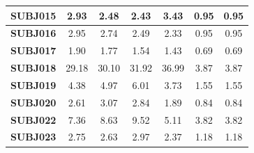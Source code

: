 \documentclass[idxtotoc,hyperref,openany]{labbook} %
\begin{document}
\begin{table}[]
\begin{tabular}{ccccccc}
		\multicolumn{1}{|c|}{\textbf{SUBJ015}}  & \multicolumn{1}{c|}{2.93}              & \multicolumn{1}{c|}{2.48}              & \multicolumn{1}{c|}{2.43}              & \multicolumn{1}{c|}{3.43}         & \multicolumn{1}{c|}{0.95}               & \multicolumn{1}{c|}{0.95}               \\ \hline
		\multicolumn{1}{|c|}{\textbf{SUBJ016}}  & \multicolumn{1}{c|}{2.95}              & \multicolumn{1}{c|}{2.74}              & \multicolumn{1}{c|}{2.49}              & \multicolumn{1}{c|}{2.33}         & \multicolumn{1}{c|}{0.95}               & \multicolumn{1}{c|}{0.95}               \\ \hline
		\multicolumn{1}{|c|}{\textbf{SUBJ017}}  & \multicolumn{1}{c|}{1.90}              & \multicolumn{1}{c|}{1.77}              & \multicolumn{1}{c|}{1.54}              & \multicolumn{1}{c|}{1.43}         & \multicolumn{1}{c|}{0.69}               & \multicolumn{1}{c|}{0.69}               \\ \hline
		\multicolumn{1}{|c|}{\textbf{SUBJ018}}  & \multicolumn{1}{c|}{29.18}             & \multicolumn{1}{c|}{30.10}             & \multicolumn{1}{c|}{31.92}             & \multicolumn{1}{c|}{36.99}        & \multicolumn{1}{c|}{3.87}               & \multicolumn{1}{c|}{3.87}               \\ \hline
		\multicolumn{1}{|c|}{\textbf{SUBJ019}}  & \multicolumn{1}{c|}{4.38}              & \multicolumn{1}{c|}{4.97}              & \multicolumn{1}{c|}{6.01}              & \multicolumn{1}{c|}{3.73}         & \multicolumn{1}{c|}{1.55}               & \multicolumn{1}{c|}{1.55}               \\ \hline
		\multicolumn{1}{|c|}{\textbf{SUBJ020}}  & \multicolumn{1}{c|}{2.61}              & \multicolumn{1}{c|}{3.07}              & \multicolumn{1}{c|}{2.84}              & \multicolumn{1}{c|}{1.89}         & \multicolumn{1}{c|}{0.84}               & \multicolumn{1}{c|}{0.84}               \\ \hline
		\multicolumn{1}{|c|}{\textbf{SUBJ022}}  & \multicolumn{1}{c|}{7.36}              & \multicolumn{1}{c|}{8.63}              & \multicolumn{1}{c|}{9.52}              & \multicolumn{1}{c|}{5.11}         & \multicolumn{1}{c|}{3.82}               & \multicolumn{1}{c|}{3.82}               \\ \hline
		\multicolumn{1}{|c|}{\textbf{SUBJ023}}  & \multicolumn{1}{c|}{2.75}              & \multicolumn{1}{c|}{2.63}              & \multicolumn{1}{c|}{2.97}              & \multicolumn{1}{c|}{2.37}         & \multicolumn{1}{c|}{1.18}               & \multicolumn{1}{c|}{1.18}               \\ \hline

\end{tabular}
\end{table}
\end{document}
